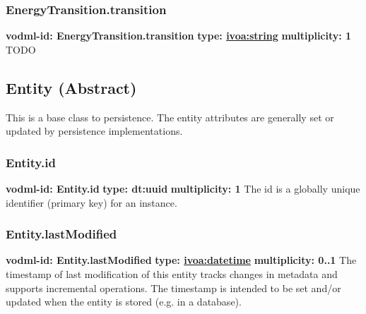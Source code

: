     \subsubsection{EnergyTransition.transition}
      \textbf{vodml-id: EnergyTransition.transition} \newline
      \textbf{type: \hyperref[sect:ivoa]{ivoa:string}} \newline
      \textbf{multiplicity: 1} \newline
      TODO

  \subsection{Entity (Abstract)}
  \label{sect:Entity}
    This is a base class to persistence. The entity attributes are generally set or updated by persistence implementations.

    \subsubsection{Entity.id}
      \textbf{vodml-id: Entity.id} \newline
      \textbf{type: dt:uuid} \newline
      \textbf{multiplicity: 1} \newline
      The id is a globally unique identifier (primary key) for an instance.

    \subsubsection{Entity.lastModified}
      \textbf{vodml-id: Entity.lastModified} \newline
      \textbf{type: \hyperref[sect:ivoa]{ivoa:datetime}} \newline
      \textbf{multiplicity: 0..1} \newline
      The timestamp of last modification of this entity tracks changes in metadata and supports incremental operations. The timestamp is intended to be set and/or updated when the entity is stored (e.g. in a database).

